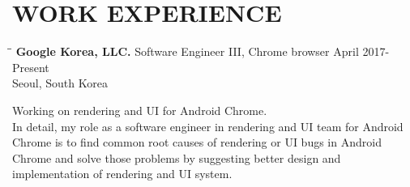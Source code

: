 \section{WORK EXPERIENCE}
   \vspace{0.1in}

   \begin{tabbing}
   \hspace{2.3in}\= \hspace{2.6in}\= \kill %
    \textbf{\large Google Korea, LLC.} \>Software Engineer III, Chrome browser     \>April 2017-Present\\
                        \>Seoul, South Korea
   \end{tabbing}\vspace{-20pt}      %
    Working on rendering and UI for Android Chrome.\\
    In detail, my role as a software engineer in rendering and UI team for Android Chrome is to find
    common root causes of rendering or UI bugs in Android Chrome and solve those problems by suggesting
    better design and implementation of rendering and UI system.
